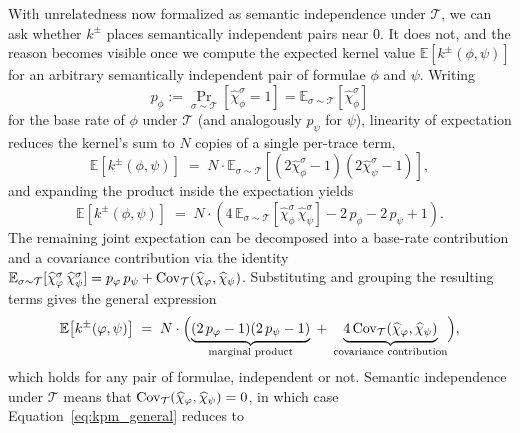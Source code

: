 \documentclass[titlepage,a4paper,11pt]{report}
\begin{document}
    With unrelatedness now formalized as semantic independence under $\mathcal{T}$, we can ask whether $k^\pm$ places semantically independent pairs near $0$. It does not, and the reason becomes visible once we compute the expected kernel value $\mathbb{E}\!\left[k^\pm(\phi, \psi)\right]$ for an arbitrary semantically independent pair of formulae $\phi$ and $\psi$. Writing
    \begin{equation}
    p_\phi := \Pr_{\sigma \sim \mathcal{T}}[\widehat\chi^\sigma_\phi = 1] = \mathbb{E}_{\sigma \sim \mathcal{T}}[\widehat\chi^\sigma_\phi]
    \end{equation}
    for the base rate of $\phi$ under $\mathcal{T}$ (and analogously $p_\psi$ for $\psi$), linearity of expectation reduces the kernel's sum to $N$ copies of a single per-trace term,
    \begin{equation}
        \mathbb{E}\!\left[k^\pm(\phi, \psi)\right]
        \;=\;
        N \cdot \mathbb{E}_{\sigma \sim \mathcal{T}}\!\left[(2\widehat\chi^\sigma_\phi - 1)(2\widehat\chi^\sigma_\psi - 1)\right],
    \end{equation}
    and expanding the product inside the expectation yields
    \begin{equation}
        \mathbb{E}\!\left[k^\pm(\phi, \psi)\right]
        \;=\;
        N \cdot \left(4\,\mathbb{E}_{\sigma \sim \mathcal{T}}\!\left[\widehat\chi^\sigma_\phi\, \widehat\chi^\sigma_\psi\right] - 2\,p_\phi - 2\,p_\psi + 1\right).
    \end{equation}
    The remaining joint expectation can be decomposed into a base-rate contribution and a covariance contribution via the identity $\mathbb{E}_{\sigma \sim \mathcal{T}}[\widehat\chi^\sigma_\varphi\, \widehat\chi^\sigma_\psi] = p_\varphi\, p_\psi + \mathrm{Cov}_{\mathcal{T}}(\widehat\chi_\varphi, \widehat\chi_\psi)$. Substituting and grouping the resulting terms gives the general expression
    \begin{equation}\label{eq:kpm_general}
        \mathbb{E}\!\left[k^\pm(\varphi, \psi)\right]
        \;=\;
        N \cdot \Bigl(
            \underbrace{(2\,p_\varphi - 1)(2\,p_\psi - 1)}_{\text{marginal product}}
            \;+\;
            \underbrace{4\,\mathrm{Cov}_{\mathcal{T}}(\widehat\chi_\varphi, \widehat\chi_\psi)}_{\text{covariance contribution}}
        \Bigr),
    \end{equation}
    which holds for any pair of formulae, independent or not. Semantic independence under $\mathcal{T}$ means that $\mathrm{Cov}_{\mathcal{T}}(\widehat\chi_\varphi, \widehat\chi_\psi) = 0$, in which case Equation~\eqref{eq:kpm_general} reduces to
\end{document}
